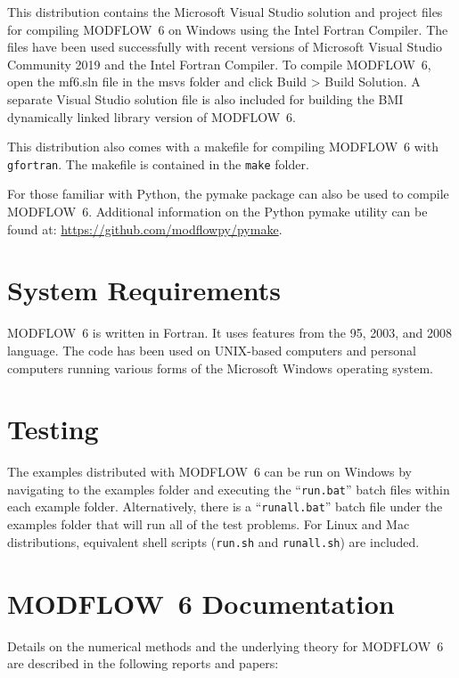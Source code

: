 \documentclass[11pt,twoside,twocolumn]{usgsreport}
\begin{document}
This distribution contains the Microsoft Visual Studio solution and project files for compiling MODFLOW~6 on Windows using the Intel Fortran Compiler.  The files have been used successfully with recent versions of Microsoft Visual Studio Community 2019 and the Intel Fortran Compiler.  To compile MODFLOW~6, open the mf6.sln file in the msvs folder and click Build >  Build Solution.  A separate Visual Studio solution file is also included for building the BMI dynamically linked library version of MODFLOW~6.

This distribution also comes with a makefile for compiling MODFLOW~6 with \texttt{gfortran}.  The makefile is contained in the \texttt{make} folder.

For those familiar with Python, the pymake package can also be used to compile MODFLOW~6.  Additional information on the Python pymake utility can be found at: \url{https://github.com/modflowpy/pymake}.  

\section{System Requirements}
MODFLOW~6 is written in Fortran.  It uses features from the 95, 2003, and 2008 language.  The code has been used on UNIX-based computers and personal computers running various forms of the Microsoft Windows operating system.

\section{Testing}
The examples distributed with MODFLOW~6 can be run on Windows by navigating to the examples folder and executing the ``\texttt{run.bat}'' batch files within each example folder.  Alternatively, there is a ``\texttt{runall.bat}'' batch file under the examples folder that will run all of the test problems.  For Linux and Mac distributions, equivalent shell scripts (\texttt{run.sh} and \texttt{runall.sh}) are included.

\section{MODFLOW~6 Documentation}
Details on the numerical methods and the underlying theory for MODFLOW~6 are described in the following reports and papers:
\end{document}
